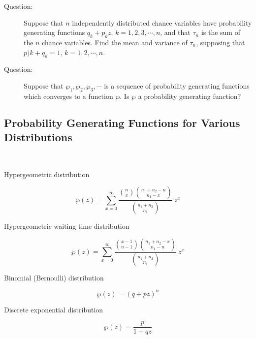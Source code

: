 \documentclass{article}
\newenvironment{question}
{ \begin{description} \item[Question:] }
{ \end{description} }
\begin{document}
\begin{question}
Suppose that $n$ independently distributed chance variables have probability generating functions $q_k + p_k z$, $k=1,2,3,\cdots,n$, and that $\tau_n$ is the sum of the $n$ chance variables. Find the mean and variance of $\tau_n$, supposing that $p)k + q_k = 1$, $k=1,2,\cdots,n$.
\end{question}

\begin{question}
Suppose that $\wp_1,\wp_2,\wp_3,\cdots$ is a sequence of probability generating functions which converges to a function $\wp$. Is $\wp$ a probability generating function?
\end{question}


\newpage

\subsection*{Probability Generating Functions for Various Distributions}

$\ $

Hypergeometric distribution

\begin{equation*}
\wp(z) = \sum_{x=0}^{\infty} \frac{ \binom{n}{x} \binom{n_1+n_2-n}{n_1-x} }{ \binom{n_1+n_2}{n_1} } \ z^x
\end{equation*}

\vspace{0.5cm}

Hypergeometric waiting time distribution

\begin{equation*}
\wp(z) = \sum_{x=0}^{\infty} \frac{ \binom{x-1}{n-1} \binom{n_1+n_2-x}{n_1-n} }{ \binom{n_1+n_2}{n_1} } \ z^x
\end{equation*}

\vspace{0.5cm}

Binomial (Bernoulli) distribution

\begin{equation*}
\wp(z) = (q + pz)^n
\end{equation*}

\vspace{0.5cm}

Discrete exponential distribution

\begin{equation*}
\wp(z) = \frac{p}{1 - qz}
\end{equation*}
\end{document}
